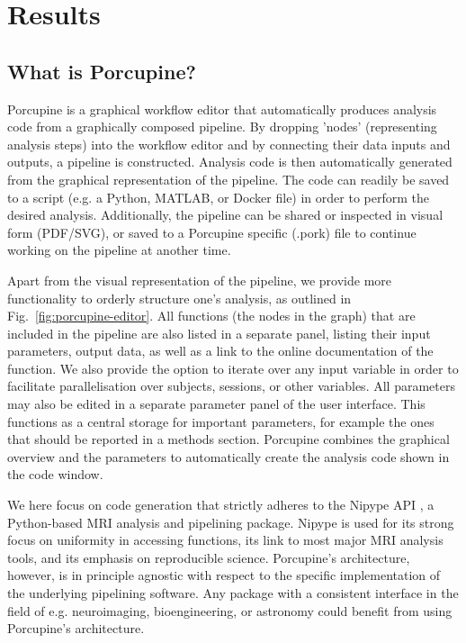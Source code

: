 \section{Results}
\subsection{What is Porcupine?}
Porcupine is a graphical workflow editor that automatically produces analysis code from a graphically composed pipeline. By dropping 'nodes' (representing analysis steps) into the workflow editor and by connecting their data inputs and outputs, a pipeline is constructed. Analysis code is then automatically generated from the graphical representation of the pipeline. The code can readily be saved to a script (e.g. a Python, MATLAB, or Docker file) in order to perform the desired analysis. Additionally, the pipeline can be shared or inspected in visual form (PDF/SVG), or saved to a Porcupine specific (.pork) file to continue working on the pipeline at another time.

Apart from the visual representation of the pipeline, we provide more functionality to orderly structure one's analysis, as outlined in Fig.~\ref{fig:porcupine-editor}. All functions (the nodes in the graph) that are included in the pipeline are also listed in a separate panel, listing their input parameters, output data, as well as a link to the online documentation of the function. We also provide the option to iterate over any input variable in order to facilitate parallelisation over subjects, sessions, or other variables. All parameters may also be edited in a separate parameter panel of the user interface. This functions as a central storage for important parameters, for example the ones that should be reported in a methods section. Porcupine combines the graphical overview and the parameters to automatically create the analysis code shown in the code window. 


We here focus on code generation that strictly adheres to the Nipype API \cite{Gorgolewski2011}, a Python-based MRI analysis and pipelining package. Nipype is used for its strong focus on uniformity in accessing functions, its link to most major MRI analysis tools, and its emphasis on reproducible science. Porcupine's architecture, however, is in principle agnostic with respect to the specific implementation of the underlying pipelining software. Any package with a consistent interface in the field of e.g. neuroimaging, bioengineering, or astronomy could benefit from using Porcupine's architecture.

